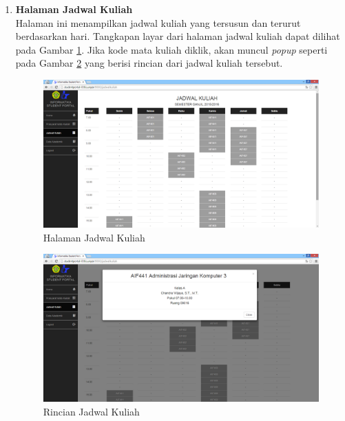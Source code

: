 \begin{enumerate}
				\item\textbf{Halaman Jadwal Kuliah}\\
				Halaman ini menampilkan jadwal kuliah yang tersusun dan terurut berdasarkan hari. Tangkapan layar dari halaman jadwal kuliah dapat dilihat pada Gambar \ref{fig:5_hasil_jadwal}. Jika kode mata kuliah diklik, akan muncul \textit{popup} seperti pada Gambar \ref{fig:5_hasil_jadwal_rinci} yang berisi rincian dari jadwal kuliah tersebut.
				\begin{figure}[H]
						\centering
						\includegraphics[scale=0.34]{Gambar/hasil_jadwal}
						\caption{Halaman Jadwal Kuliah} 
						\label{fig:5_hasil_jadwal}
					\end{figure}
					
					\begin{figure}[H]
						\centering
						\includegraphics[scale=0.34]{Gambar/hasil_jadwal_popup}
						\caption{Rincian Jadwal Kuliah} 
						\label{fig:5_hasil_jadwal_rinci}
					\end{figure}
					

\end{enumerate}

